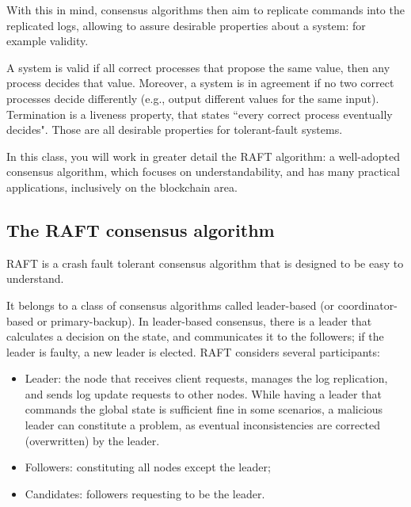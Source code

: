 \documentclass[12pt,a4paper]{article}
\begin{document}
With this in mind, consensus algorithms then aim to replicate commands into the replicated logs, allowing to assure desirable properties about a system: for example validity.

A system is valid if all correct processes that propose the same value, then any process decides that value. Moreover, a system is in agreement if no two correct processes decide differently (e.g., output different values for the same input). Termination is a liveness property, that states ``every correct process eventually decides". Those are all desirable properties for tolerant-fault systems. 

In this class, you will work in greater detail the RAFT algorithm: a well-adopted consensus algorithm, which focuses on understandability, and has many practical applications, inclusively on the blockchain area. 




 
\subsection{The RAFT consensus algorithm}

RAFT is a crash fault tolerant consensus algorithm that is designed to be easy to understand.  %

It belongs to a class of consensus algorithms called leader-based (or coordinator-based or primary-backup). In leader-based consensus, there is a leader that calculates a decision on the state, and communicates it to the followers; if the leader is faulty, a new leader is elected.
RAFT considers several participants: 
\begin{itemize}
    \item Leader: the node that receives client requests, manages the log replication, and sends log update requests to other nodes. While having a leader that commands the global state is sufficient fine in some scenarios, a malicious leader can constitute a problem, as eventual inconsistencies are corrected (overwritten) by the leader.
    \item  Followers: constituting all nodes except the leader; 
    \item Candidates: followers requesting to be the leader.
\end{itemize}
\end{document}
